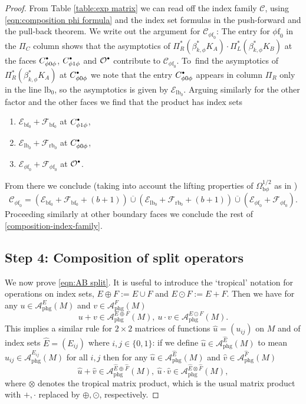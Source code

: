 \documentclass[11pt]{article}
\numberwithin{equation}{section}
\newcommand{\bbullet}{{\scriptscriptstyle\bullet}}
\newcommand{\sbullet}{{\raisebox{1pt}{$\bbullet$}}}
\newcommand{\bphi}{{\bb\phi}}
\theoremstyle{plain}
\theoremstyle{definition}
\newcommand\calA{{\mathcal A}}
\newcommand\calC{{\mathcal C}}
\newcommand\calE{{\mathcal E}}
\newcommand\calO{{\mathcal O}}
\newcommand {\phg}{{\mathrm{phg}}}
\newcommand{\phif}{{\phi\mathrm{f}}}
\newcommand{\lf}{{\mathrm{lb}}}
\newcommand{\rf}{{\mathrm{rb}}}
\newcommand{\bb}{{\mathrm{b}}}
\newcommand{\bbf}{{\mathrm{bf}}}
\newcommand{\Ewhat}{{\widehat{E}}}
\newcommand{\Fwhat}{{\widehat{F}}}
\newcommand {\uhat} {{\hat{u}}}
\newcommand {\vhat} {{\hat{v}}}
\begin{document}
\begin{proof}
From Table \ref{table:exp matrix} we can read off the index family $\mathscr{C}$, using \eqref{eqn:composition phi formula} and the index set formulas in the push-forward and the pull-back theorem. We write out the argument for $\mathscr{C}_{\phif_0}$:
The entry for $\phif_0$ in the $\Pi_C$ column shows that the asymptotics of $ \Pi_{R}^{*}(\beta_{k,\phi}^* K_{A}) \cdot
\Pi_{L}^{*}(\beta_{k,\phi}^* K_{B})$ at the faces $C_{\phi0\phi}^\sbullet$, $C_{\phi1\phi}^\sbullet$ and $\calO^\sbullet$ contribute to $\calC_{\phif_0}$.
To~find the asymptotics of $\Pi_{R}^{*}(\beta_{k,\phi}^* K_{A})$ at
$C_{\phi0\phi}^\sbullet$ we note that the entry $C_{\phi0\phi}^\sbullet$ appears in column $\Pi_R$ only in the line $\lf_0$, so the asymptotics is given by $\calE_{\lf_0}$. Arguing similarly for the other factor and the other faces we find that the product has index sets
\begin{enumerate}
\item $\mathcal{E}_{\bbf_0} + \mathcal{F}_{\bbf_0}$ at $C_{\phi1\phi}^\sbullet$,
\item $\mathcal{E}_{\lf_0} + \mathcal{F}_{\rf_0}$ at $C_{\phi0\phi}^\sbullet$,
\item $\mathcal{E}_{\phif_0} + \mathcal{F}_{\phif_0}$ at $\calO^\sbullet$.
\end{enumerate}
From there we conclude (taking into account the
lifting properties of $\Omega_{\bphi}^{1/2} $ as in \cite[Th.\,9]{grieser-para})
\[
\mathscr{C}_{\phif_0} = \left(\mathcal{E}_{\bbf_0} + \mathcal{F}_{\bbf_0} + (b+1)\right)
\overline{\cup} \left(\mathcal{E}_{\lf_0} + \mathcal{F}_{\rf_0} + (b+1)\right)
\overline{\cup}(\mathcal{E}_{\phif_0} + \mathcal{F}_{\phif_0}).
\]
Proceeding similarly at other boundary faces we conclude the rest of \eqref{composition-index-family}.

\subsection*{Step 4: Composition of split operators}
We now prove \eqref{eqn:AB split}.
It is useful to intro\-duce the `tropical' notation for operations on index sets, $E\oplus F:=E \cup F$ and \hbox{$E\odot F:= E+F$}. Then we have for any $ u\in \calA^E_{\phg}(M)$ and $v\in \calA^F_{\phg}(M)$
\[
u+v\in\calA^{E\oplus F}_{\phg}(M),\
u\cdot v \in \calA^{E\odot F}_{\phg}(M).
\]
This implies a similar rule for $2\times2$ matrices of functions $\uhat=(u_{ij})$ on $M$ and of index sets $\Ewhat=(E_{ij})$ where $i,j\in\{0,1\}$: if we define $\uhat\in\calA^\Ewhat_{\phg}(M)$ to mean
$u_{ij}\in\calA^{E_{ij}}_{\phg}(M)$ for all $i,j$ then for any
$\uhat\in \calA^\Ewhat_{\phg}(M)$ and $\vhat\in \calA^\Fwhat_{\phg}(M)$
\[
\uhat+\vhat\in\calA^{\Ewhat\oplus \Fwhat}_{\phg}(M),\
\uhat\cdot\vhat \in \calA^{\Ewhat\otimes \Fwhat}_{\phg}(M),
\]
where $\otimes$ denotes the tropical matrix product, which is the usual matrix product with
$+,\cdot$ replaced by $\oplus,\odot$, respectively.


\end{proof}
\end{document}
